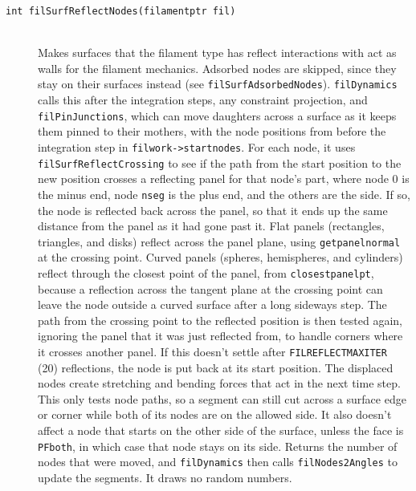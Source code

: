 \documentclass {scrbook}
\newcommand {\ttt} {\texttt}
\begin{document}
\begin{description}
\item[\ttt{int filSurfReflectNodes(filamentptr fil)}] %
\hfill \\
Makes surfaces that the filament type has reflect interactions with act as walls for the filament mechanics. Adsorbed nodes are skipped, since they stay on their surfaces instead (see \ttt{filSurfAdsorbedNodes}). \ttt{filDynamics} calls this after the integration steps, any constraint projection, and \ttt{filPinJunctions}, which can move daughters across a surface as it keeps them pinned to their mothers, with the node positions from before the integration step in \ttt{filwork->startnodes}. For each node, it uses \ttt{filSurfReflectCrossing} to see if the path from the start position to the new position crosses a reflecting panel for that node's part, where node 0 is the minus end, node \ttt{nseg} is the plus end, and the others are the side. If so, the node is reflected back across the panel, so that it ends up the same distance from the panel as it had gone past it. Flat panels (rectangles, triangles, and disks) reflect across the panel plane, using \ttt{getpanelnormal} at the crossing point. Curved panels (spheres, hemispheres, and cylinders) reflect through the closest point of the panel, from \ttt{closestpanelpt}, because a reflection across the tangent plane at the crossing point can leave the node outside a curved surface after a long sideways step. The path from the crossing point to the reflected position is then tested again, ignoring the panel that it was just reflected from, to handle corners where it crosses another panel. If this doesn't settle after \ttt{FILREFLECTMAXITER} (20) reflections, the node is put back at its start position. The displaced nodes create stretching and bending forces that act in the next time step. This only tests node paths, so a segment can still cut across a surface edge or corner while both of its nodes are on the allowed side. It also doesn't affect a node that starts on the other side of the surface, unless the face is \ttt{PFboth}, in which case that node stays on its side. Returns the number of nodes that were moved, and \ttt{filDynamics} then calls \ttt{filNodes2Angles} to update the segments. It draws no random numbers.


\end{description}
\end{document}
